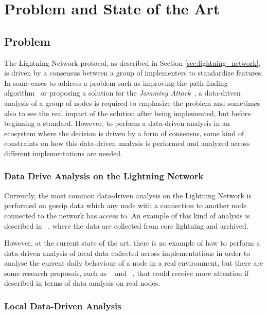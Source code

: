 \chapter{Problem and State of the Art}\label{sec:problem_and_state_of_the_art}

\section{Problem}

The Lightning Network protocol, as described in Section \ref{sec:lightning_network}, is 
driven by a consensus between a group of implementers to standardize
features. In some cases to address a problem such as 
improving the path-finding algorithm~\cite{DBLP:journals/corr/abs-2103-08576} or 
proposing a solution for the \emph{Jamming Attack}~\cite{cryptoeprint:2022/1454}, 
a data-driven analysis of a group of nodes is required to emphasize the
problem and sometimes also to see the real impact of the solution after being 
implemented, but before beginning a standard.
However, to perform a data-driven analysis in an ecosystem where the decision
is driven by a form of consensus, some kind of 
constraints on how this data-driven analysis is performed and analyzed across 
different implementations are needed.

\subsection{Data Drive Analysis on the Lightning Network}

Currently, the most common data-driven analysis on the Lightning Network is performed 
on gossip data which any node  with a connection to another node connected 
to the network has access to. An example of this kind of analysis is described in ~\cite{lngossip},
where the data are collected from core lightning and archived.

However, at the current state of the art, there is no example of how to perform
a data-driven analysis of local data collected across implementations in order to 
analyse the current daily behaviour of a node in a real environment, but there are some research proposals,  such as ~\cite{DBLP:journals/corr/abs-2103-08576} and ~\cite{cryptoeprint:2022/1454}, that could receive more attention if described  in terms 
of  data analysis on real nodes.


\subsection{Local Data-Driven Analysis}

